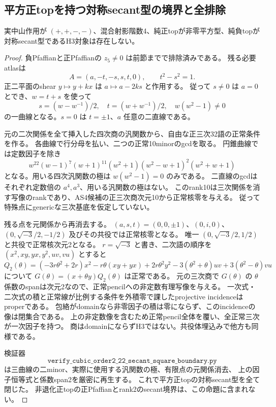 \subsection{平方正topを持つ対称secant型の境界と全排除}
\begin{proposition}
実中山作用が $(+,+,-,-)$、混合射影階数4、純正topが非零平方型、純負topが対称secant型であるH3対象は存在しない。
\end{proposition}
\begin{proof}
負Pfaffianと正Pfaffianの $z_5\ne0$ は前節までで排除済みである。
残る必要atlasは
\[
 A=(a,-t,-s,s,t,0),\qquad t^2-s^2=1.
\]
正二平面のshear $y\mapsto y+kx$ は $a\mapsto a-2ks$ と作用する。
従って $s\ne0$ は $a=0$ とでき、$w=t+s$ を使って
\[
 s=(w-w^{-1})/2,\quad t=(w+w^{-1})/2,\quad w(w^2-1)\ne0
\]
の一曲線となる。$s=0$ は $t=\pm1$、$a$ 任意の二直線である。

元の二次関係を全て挿入した四次商の汎関数から、自由な正三次32語の正常条件を作る。
各曲線で行分母を払い、二つの正常10minorのgcdを取る。
円錐曲線では定数因子を除き
\[
 w^{22}(w-1)^7(w+1)^{11}(w^2+1)(w^2-w+1)^2(w^2+w+1)
\]
となる。用いる四次汎関数の極は $w(w^2-1)=0$ のみである。
二直線のgcdはそれぞれ定数倍の $a^4,a^3$、用いる汎関数の極はない。
このrank10は三次関係を消す写像のrankであり、AS4候補の正三次商次元10から正常核零を与える。
従って特殊点にgenericな三次基底を仮定していない。

残る点を元関係から再消去する。
$(a,s,t)=(0,0,\pm1)$、$(0,i,0)$、$(0,\sqrt{-3}/2,-1/2)$
及びその共役では正常核零となる。
唯一 $(0,\sqrt{-3}/2,1/2)$ と共役で正常核次元2となる。
$r=\sqrt{-3}$ と書き、二次語の順序を $(x^2,xy,yx,y^2,uv,vu)$ とすると
\[
 Q_2(\theta)=
 (-3r\theta^2+2r)x^2-r\theta(xy+yx)+2r\theta^2y^2
 -3(\theta^2+\theta)uv+3(\theta^2-\theta)vu
\]
について $G(\theta)=(x+\theta y)Q_2(\theta)$ は正常である。
元の三次商で $G(\theta)$ の $\theta$ 係数のspanは次元2なので、正常pencilへの非定数有理写像を与える。
一次式・二次式の積と正常線が比例する条件を外積零で課したprojective incidenceはproperである。
包絡がdomainなら非零因子の積は零にならず、このincidenceの像は閉集合である。
上の非定数像を含むため正常pencil全体を覆い、全正常三次が一次因子を持つ。
商はdomainにならずH3ではない。共役体埋込みで他方も同様である。

検証器
\[
\texttt{verify\_cubic\_order2\_22\_secant\_square\_boundary.py}
\]
は三曲線の二minor、実際に使用する汎関数の極、有限点の元関係消去、
上の因子恒等式と係数span2を厳密に再生する。
これで平方正topの対称secant型を全て閉じた。
非退化正topの正Pfaffianとrank2のsecant境界は、この命題に含まれない。
\end{proof}
